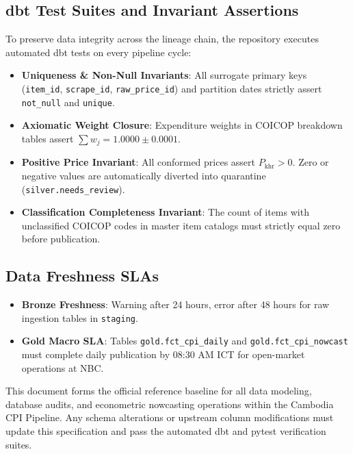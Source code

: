 \documentclass[a4paper, 11pt]{article}
\begin{document}
\subsection{dbt Test Suites and Invariant Assertions}
To preserve data integrity across the lineage chain, the repository executes automated dbt tests on every pipeline cycle:
\begin{itemize}[leftmargin=*]
    \item \textbf{Uniqueness \& Non-Null Invariants}: All surrogate primary keys (\texttt{item\_id}, \texttt{scrape\_id}, \texttt{raw\_price\_id}) and partition dates strictly assert \texttt{not\_null} and \texttt{unique}.
    \item \textbf{Axiomatic Weight Closure}: Expenditure weights in COICOP breakdown tables assert $\sum w_j = 1.0000 \pm 0.0001$.
    \item \textbf{Positive Price Invariant}: All conformed prices assert $P_{\text{khr}} > 0$. Zero or negative values are automatically diverted into quarantine (\texttt{silver.needs\_review}).
    \item \textbf{Classification Completeness Invariant}: The count of items with unclassified COICOP codes in master item catalogs must strictly equal zero before publication.
\end{itemize}

\subsection{Data Freshness SLAs}
\begin{itemize}[leftmargin=*]
    \item \textbf{Bronze Freshness}: Warning after 24 hours, error after 48 hours for raw ingestion tables in \texttt{staging}.
    \item \textbf{Gold Macro SLA}: Tables \texttt{gold.fct\_cpi\_daily} and \texttt{gold.fct\_cpi\_nowcast} must complete daily publication by 08:30 AM ICT for open-market operations at NBC.
\end{itemize}

\vspace{1.0cm}
\begin{tcolorbox}[colback=primaryblue!10, colframe=primaryblue, title=Technical Specification Summary]
This document forms the official reference baseline for all data modeling, database audits, and econometric nowcasting operations within the Cambodia CPI Pipeline. Any schema alterations or upstream column modifications must update this specification and pass the automated dbt and pytest verification suites.
\end{tcolorbox}
\end{document}
